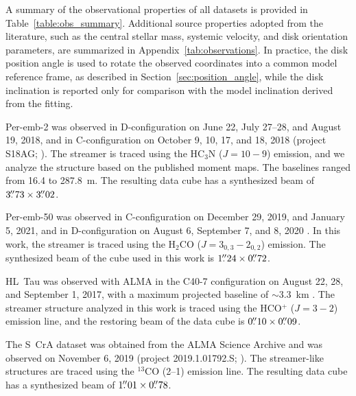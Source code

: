 A summary of the observational properties of all datasets is provided in Table~\ref{table:obs_summary}. Additional source properties adopted from the literature, such as the central stellar mass, systemic velocity, and disk orientation parameters, are summarized in Appendix~\ref{tab:observations}. In practice, the disk position angle is used to rotate the observed coordinates into a common model reference frame, as described in Section~\ref{sec:position_angle}, while the disk inclination is reported only for comparison with the model inclination derived from the fitting.

Per-emb-2 was observed in D-configuration on June 22, July 27--28, and August 19, 2018, and in C-configuration on October 9, 10, 17, and 18, 2018 (project S18AG; \citealt{Pineda_2020}). The streamer is traced using the HC$_3$N ($J=10-9$) emission, and we analyze the structure based on the published moment maps. The baselines ranged from 16.4 to 287.8~m. The resulting data cube has a synthesized beam of $3\mbox{$.\!\!^{\prime\prime}$}73\times3\mbox{$.\!\!^{\prime\prime}$}02$.

Per-emb-50 was observed in C-configuration on December 29, 2019, and January 5, 2021, and in D-configuration on August 6, September 7, and 8, 2020 \citep{Valdivia-Mena_2022}. In this work, the streamer is traced using the H$_2$CO ($J=3_{0,3}-2_{0,2}$) emission. The synthesized beam of the cube used in this work is $1\mbox{$.\!\!^{\prime\prime}$}24\times0\mbox{$.\!\!^{\prime\prime}$}72$.


HL~Tau was observed with ALMA in the C40-7 configuration on August 22, 28, and September 1, 2017, with a maximum projected baseline of $\sim$3.3~km \citep{Yen_2019}. The streamer structure analyzed in this work is traced using the HCO$^+$ ($J=3-2$) emission line, and the restoring beam of the data cube is $0\mbox{$.\!\!^{\prime\prime}$}10\times0\mbox{$.\!\!^{\prime\prime}$}09$.

The S~CrA dataset was obtained from the ALMA Science Archive and was observed on November 6, 2019 (project 2019.1.01792.S; \citealt{Gupta_2023}). The streamer-like structures are traced using the $^{13}$CO (2--1) emission line. The resulting data cube has a synthesized beam of $1\mbox{$.\!\!^{\prime\prime}$}01\times0\mbox{$.\!\!^{\prime\prime}$}78$.

